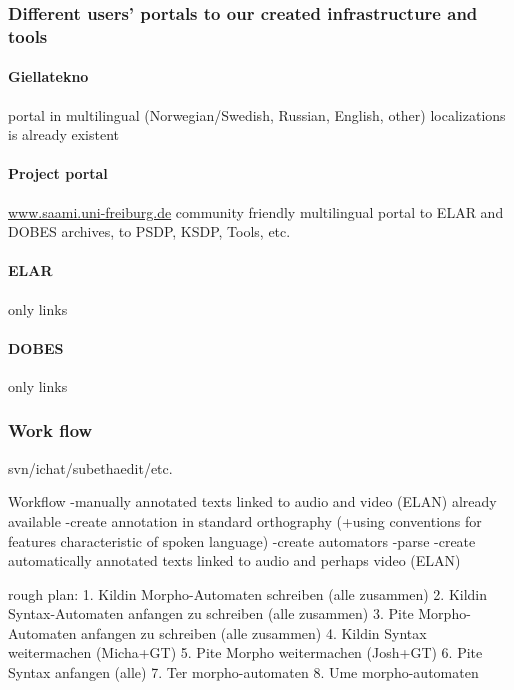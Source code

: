 \documentclass[a4paper,12pt]{article}
\begin{document}
\subsubsection{Different users' portals to our created infrastructure and tools}

\paragraph{Giellatekno} portal in multilingual (Norwegian/Swedish, Russian, English, other) localizations is already existent

\paragraph{Project portal} \url{www.saami.uni-freiburg.de} community friendly multilingual portal to ELAR and DOBES archives, to PSDP, KSDP, Tools, etc. 

\paragraph{ELAR} only links

\paragraph{DOBES} only links

\subsubsection{Work flow}
svn/ichat/subethaedit/etc.

Workflow
-manually annotated texts linked to audio and video (ELAN) already available
-create annotation in standard orthography (+using conventions for features characteristic of spoken language)
-create automators
-parse
-create automatically annotated texts linked to audio and perhaps video (ELAN)

rough plan:
1. Kildin Morpho-Automaten schreiben (alle zusammen)
2. Kildin Syntax-Automaten anfangen zu schreiben (alle zusammen)
3. Pite Morpho-Automaten anfangen zu schreiben (alle zusammen)
4. Kildin Syntax weitermachen (Micha+GT)
5. Pite Morpho weitermachen (Josh+GT)
6. Pite Syntax anfangen (alle)
7. Ter morpho-automaten
8. Ume morpho-automaten

\end{document}
